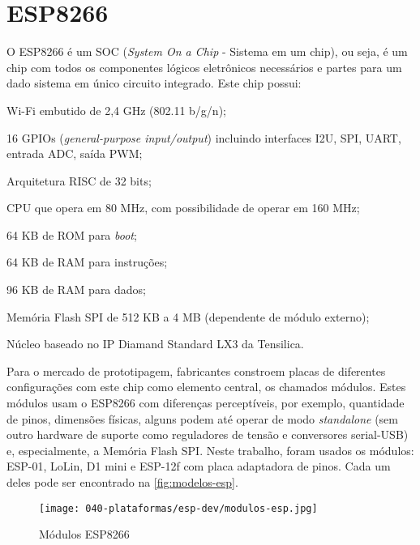 \section{ESP8266}
\label{sec:ESP8266}

O ESP8266 é um SOC (\emph{System On a Chip} - Sistema em um chip),
ou seja, é um chip com todos os componentes lógicos
eletrônicos necessários e partes para um dado sistema em único circuito
integrado. Este chip possui:


\begin{alineas}
	\item Wi-Fi embutido de 2,4 GHz (802.11 b/g/n);

	\item 16 GPIOs (\emph{general-purpose input/output}) incluindo interfaces
 I2U, SPI, UART, entrada ADC, saída PWM;

	\item Arquitetura RISC de 32 bits;

	\item CPU que opera em  80 MHz, com possibilidade de operar em 160 MHz;

	\item 64 KB de ROM para \emph{boot};

	\item 64 KB de RAM para instruções;

	\item 96 KB de RAM para dados;

	\item Memória Flash SPI de 512 KB a 4 MB (dependente de módulo externo);

	\item Núcleo baseado no IP Diamand Standard LX3 da Tensilica.

\end{alineas}

Para o mercado de prototipagem, fabricantes constroem placas de diferentes configurações com
este chip como elemento central, os chamados módulos. Estes módulos usam o
ESP8266 com diferenças perceptíveis, por exemplo, quantidade de pinos, dimensões
físicas, alguns podem até operar de modo \emph{standalone} (sem outro hardware de
suporte como reguladores de tensão e conversores serial-USB) e, especialmente, a
 Memória Flash SPI. Neste trabalho, foram usados os módulos:
ESP-01, LoLin, D1 mini e ESP-12f com placa adaptadora de pinos.
Cada um deles pode ser encontrado na \autoref{fig:modelos-esp}.


\begin{figure}[htb]
	\caption{\label{fig:modelos-esp}Módulos ESP8266}
	\begin{center}
		\texttt{[image: 040-plataformas/esp-dev/modulos-esp.jpg]}
	\end{center}
\end{figure}


